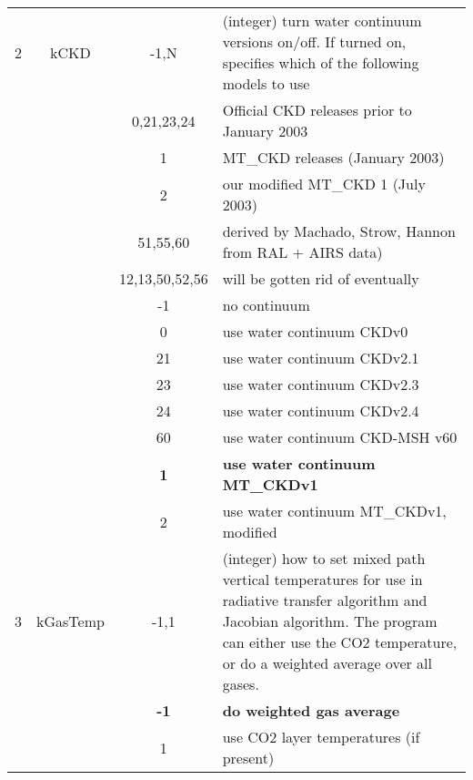 \documentclass[12pt]{article}
\newlength{\colwidth}
\newlength{\colwidthshort}
\begin{document}
\begin{small}
\begin{longtable}{|c|c|c|p{\colwidthshort}|}
2  & {\sf kCKD} & -1,N    & (integer) turn water continuum versions 
on/off. If turned on, specifies which of the  following models to use \\
   & & 0,21,23,24 & Official CKD releases prior to January 2003\\
   & & 1 & MT\_CKD releases (January 2003)\\
   & & 2 & our modified MT\_CKD 1 (July 2003) \\
   & & 51,55,60 & derived by Machado, Strow, Hannon from RAL + AIRS data)\\
   & & 12,13,50,52,56 & will be gotten rid of eventually\\
   &           &  -1   & no continuum\\
   &           &   0   & use water continuum CKDv0 \\
   &           &   21  & use water continuum CKDv2.1\\
   &           &   23  & use water continuum CKDv2.3 \\ 
   &           &   24  & use water continuum CKDv2.4 \\ 
   &           &   60  & use water continuum CKD-MSH v60\\
   &           &   \bf{1}  & \bf{use water continuum MT\_CKDv1} \\
   &           &   2       & use water continuum MT\_CKDv1, modified \\ \hline

3  & {\sf kGasTemp} & -1,1       & (integer) how to set mixed path vertical 
temperatures for use in radiative transfer algorithm and Jacobian algorithm. 
The program can either use the CO2 temperature, or do a weighted average 
over all gases.\\
   &        & {\bf -1}    & {\bf do weighted gas average}\\
   &        & 1           &  use CO2 layer temperatures (if present)\\\hline


\end{longtable}
\end{small}
\end{document}
